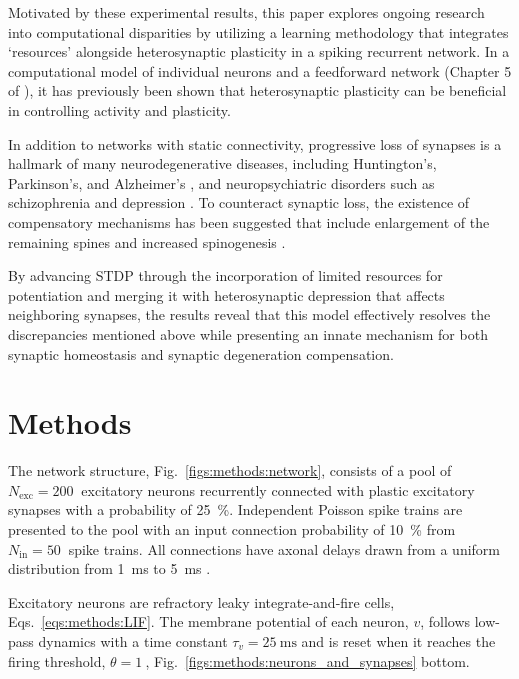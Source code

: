 \documentclass[utf8]{FrontiersinHarvard} %
\begin{document}
Motivated by these experimental results, this paper explores ongoing research into computational disparities by utilizing a learning methodology that integrates `resources' alongside heterosynaptic plasticity in a spiking recurrent network. In a computational model of individual neurons \citep{Chen.201381r} and a feedforward network (Chapter 5 of \citep{Humble.2013}), it has previously been shown that heterosynaptic plasticity can be beneficial in controlling activity and plasticity.

In addition to networks with static connectivity, progressive loss of synapses is a hallmark of many neurodegenerative diseases, including Huntington's, Parkinson's, and Alzheimer's \citep{Herms.2015,Meftah.2023}, and neuropsychiatric disorders such as schizophrenia and depression \citep{Penzes.2011}. To counteract synaptic loss, the existence of compensatory mechanisms has been suggested that include enlargement of the remaining spines and increased spinogenesis \citep{Bhembre.2023}.

By advancing STDP through the incorporation of limited resources for potentiation and merging it with heterosynaptic depression that affects neighboring synapses, the results reveal that this model effectively resolves the discrepancies mentioned above while presenting an innate mechanism for both synaptic homeostasis and synaptic degeneration compensation.

\section{Methods}
The network structure, Fig.~\ref{figs:methods:network}, consists of a pool of $N_{\mathrm{exc}}=\SI{200}{}$ excitatory neurons recurrently connected with plastic excitatory synapses with a probability of \SI{25}{\percent}. Independent Poisson spike trains are presented to the pool with an input connection probability of \SI{10}{\percent} from $N_{\mathrm{in}}=\SI{50}{}$ spike trains. All connections have axonal delays drawn from a uniform distribution from \SI{1}{\milli\second} to \SI{5}{\milli\second} \citep{Lemarechal.2021yt1}.

Excitatory neurons are refractory leaky integrate-and-fire cells, Eqs.~\ref{eqs:methods:LIF}. The membrane potential of each neuron, $v$, follows low-pass dynamics with a time constant $\tau_{v}=\SI{25}{\milli\second}$ \citep{Rall.1969w7} and is reset when it reaches the firing threshold, $\theta=\SI{1}{}$, Fig.~\ref{figs:methods:neurons_and_synapses} bottom.
\end{document}
